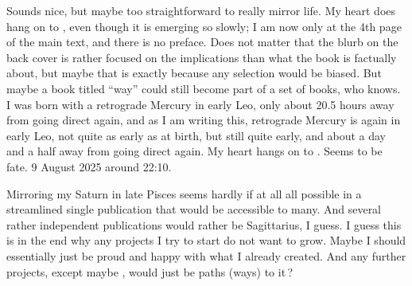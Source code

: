 \begin{itemize}
Sounds nice,
but maybe too straightforward to really mirror life.
%
My heart does hang on to \ELEMENTAL,
even though it is emerging so slowly;
I am now only at the 4th page of the main text,
and there is no preface.
%
Does not matter that the blurb on the back cover
is rather focused on the implications than what the book is factually about,
but maybe that is exactly because any selection would be biased.
%
But maybe a book titled “way” could still become part of a set of books,
who knows.
%
I was born with a retrograde Mercury in early Leo,
only about 20.5 hours away from going direct again,
and as I am writing this,
retrograde Mercury is again in early Leo,
not quite as early as at birth,
but still quite early,
and about a day and a half away from going direct again.
%
My heart hangs on to \ELEMENTAL.
%
Seems to be fate.
%
9 August 2025 around 22:10.

Mirroring my Saturn in late Pisces
seems hardly if at all all possible
in a streamlined single publication that would be accessible to many.
%
And several rather independent publications would rather be Sagittarius,
I guess.
%
I guess this is in the end
why any projects I try to start do not want to grow.
%
Maybe I should essentially just be proud and happy
with what I already created.
%
And any further projects,
except maybe \ELEMENTAL,
would just be paths (ways) to it\,?


\end{itemize}

